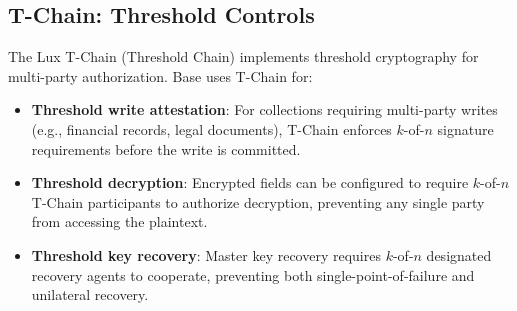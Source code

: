 \subsection{T-Chain: Threshold Controls}

The Lux T-Chain (Threshold Chain) implements threshold cryptography for
multi-party authorization. Base uses T-Chain for:

\begin{itemize}[leftmargin=1.1em]
    \item \textbf{Threshold write attestation}: For collections requiring
    multi-party writes (e.g., financial records, legal documents), T-Chain
    enforces $k$-of-$n$ signature requirements before the write is committed.
    \item \textbf{Threshold decryption}: Encrypted fields can be configured to
    require $k$-of-$n$ T-Chain participants to authorize decryption, preventing
    any single party from accessing the plaintext.
    \item \textbf{Threshold key recovery}: Master key recovery requires
    $k$-of-$n$ designated recovery agents to cooperate, preventing both
    single-point-of-failure and unilateral recovery.
\end{itemize}

